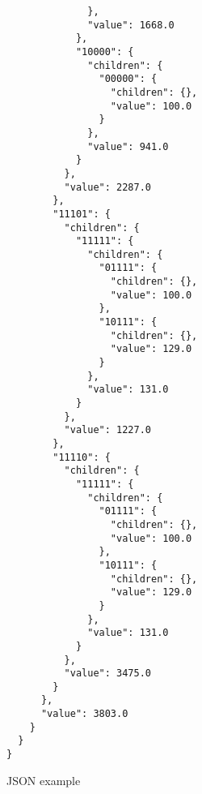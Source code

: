 \documentclass{article}
\begin{document}
\begin{listing}
\begin{verbatim}
              },
              "value": 1668.0
            },
            "10000": {
              "children": {
                "00000": {
                  "children": {},
                  "value": 100.0
                }
              },
              "value": 941.0
            }
          },
          "value": 2287.0
        },
        "11101": {
          "children": {
            "11111": {
              "children": {
                "01111": {
                  "children": {},
                  "value": 100.0
                },
                "10111": {
                  "children": {},
                  "value": 129.0
                }
              },
              "value": 131.0
            }
          },
          "value": 1227.0
        },
        "11110": {
          "children": {
            "11111": {
              "children": {
                "01111": {
                  "children": {},
                  "value": 100.0
                },
                "10111": {
                  "children": {},
                  "value": 129.0
                }
              },
              "value": 131.0
            }
          },
          "value": 3475.0
        }
      },
      "value": 3803.0
    }
  }
}
\end{verbatim}
\caption{JSON example}
\label{json-example}
\end{listing}
\end{document}
